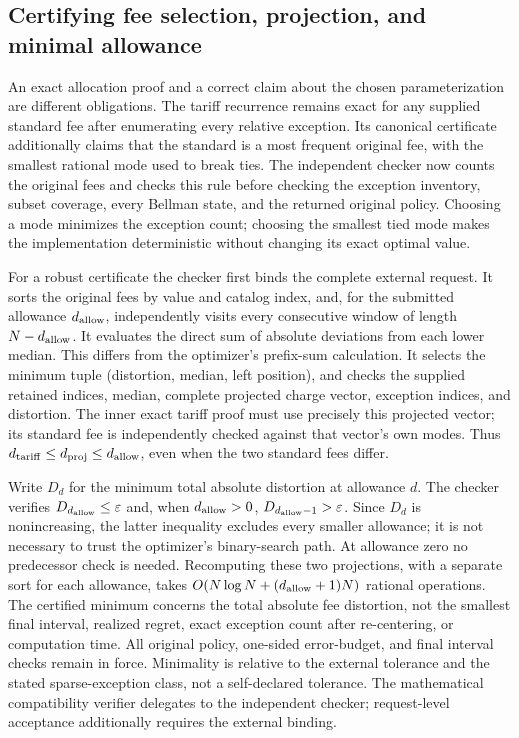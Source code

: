 \documentclass[11pt,letterpaper]{article}
\theoremstyle{definition}\newtheorem{remark}[theorem]{Remark}
\begin{document}
\subsection{Certifying fee selection, projection, and minimal allowance}\label{sec:semantic64}
An exact allocation proof and a correct claim about the chosen parameterization are different obligations. The tariff recurrence remains exact for any supplied standard fee after enumerating every relative exception. Its canonical certificate additionally claims that the standard is a most frequent original fee, with the smallest rational mode used to break ties. The independent checker now counts the original fees and checks this rule before checking the exception inventory, subset coverage, every Bellman state, and the returned original policy. Choosing a mode minimizes the exception count; choosing the smallest tied mode makes the implementation deterministic without changing its exact optimal value.

For a robust certificate the checker first binds the complete external request. It sorts the original fees by value and catalog index, and, for the submitted allowance $d_{\rm allow}$, independently visits every consecutive window of length $N-d_{\rm allow}$. It evaluates the direct sum of absolute deviations from each lower median. This differs from the optimizer's prefix-sum calculation. It selects the minimum tuple (distortion, median, left position), and checks the supplied retained indices, median, complete projected charge vector, exception indices, and distortion. The inner exact tariff proof must use precisely this projected vector; its standard fee is independently checked against that vector's own modes. Thus $d_{\rm tariff}\leq d_{\rm proj}\leq d_{\rm allow}$, even when the two standard fees differ.

Write $D_d$ for the minimum total absolute distortion at allowance $d$. The checker verifies $D_{d_{\rm allow}}\leq\varepsilon$ and, when $d_{\rm allow}>0$, $D_{d_{\rm allow}-1}>\varepsilon$. Since $D_d$ is nonincreasing, the latter inequality excludes every smaller allowance; it is not necessary to trust the optimizer's binary-search path. At allowance zero no predecessor check is needed. Recomputing these two projections, with a separate sort for each allowance, takes $O(N\log N+(d_{\rm allow}+1)N)$ rational operations. The certified minimum concerns the total absolute fee distortion, not the smallest final interval, realized regret, exact exception count after re-centering, or computation time. All original policy, one-sided error-budget, and final interval checks remain in force. Minimality is relative to the external tolerance and the stated sparse-exception class, not a self-declared tolerance. The mathematical compatibility verifier delegates to the independent checker; request-level acceptance additionally requires the external binding.
\end{document}
